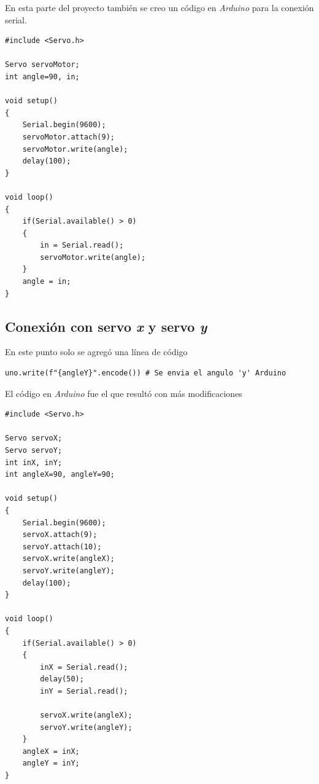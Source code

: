 \documentclass[12pt, oneside]{article}
\begin{document}
{    \hspace{0.5cm} En esta parte del proyecto también se creo un código en
    \emph{Arduino} para la conexión serial.

    \begin{lstlisting}[style=arduinoScript]
#include <Servo.h>

Servo servoMotor;
int angle=90, in;

void setup()
{
    Serial.begin(9600);
    servoMotor.attach(9);
    servoMotor.write(angle);
    delay(100);
}

void loop()
{
    if(Serial.available() > 0)
    {
        in = Serial.read();
        servoMotor.write(angle);
    }
    angle = in;
}

    \end{lstlisting}

}

\newpage
\subsection{Conexión con servo \emph{x} y servo \emph{y}}
{\sffamily\large\justify
    \hspace{0.5cm} En este punto solo se agregó una línea de código

    \begin{lstlisting}[style=pythonScript]
uno.write(f"{angleY}".encode()) # Se envia el angulo 'y' Arduino
    \end{lstlisting}

    \hspace{0.5cm} El código en \emph{Arduino} fue el que resultó con más modificaciones

    \begin{lstlisting}[style=arduinoScript]
#include <Servo.h>

Servo servoX;
Servo servoY;
int inX, inY;
int angleX=90, angleY=90;

void setup()
{
    Serial.begin(9600);
    servoX.attach(9);
    servoY.attach(10);
    servoX.write(angleX);
    servoY.write(angleY);
    delay(100);
}

void loop()
{
    if(Serial.available() > 0)
    {
        inX = Serial.read();
        delay(50);
        inY = Serial.read();

        servoX.write(angleX);
        servoY.write(angleY);
    }
    angleX = inX;
    angleY = inY;
}
    \end{lstlisting}

}

\newpage
\end{document}
